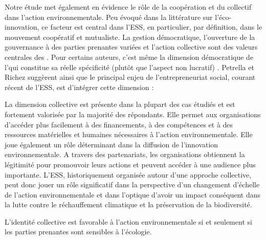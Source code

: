         Notre étude met également en évidence le rôle de la coopération et du collectif dans l'action environnementale. Peu évoqué dans la littérature sur l'éco-innovation, ce facteur est central dans l'ESS, en particulier, par définition, dans le mouvement coopératif et mutualiste. La gestion démocratique, l'ouverture de la gouvernance à des parties prenantes variées et l'action collective sont des valeurs centrales des \oess. Pour certains auteurs, c'est même la dimension démocratique de l'\ess qui constitue sa réelle spécificité (plutôt que l'aspect non lucratif) \parencite{mccambridge2004underestimating}. Petrella et Richez suggèrent ainsi que le principal enjeu de l'entrepreneuriat social, courant récent de l'ESS, est d'intégrer cette dimension :
        \begin{quotation}
             \parencite{petrella2014social}
        \end{quotation}

        La dimension collective est présente dans la plupart des cas étudiés et est fortement valorisée par la majorité des répondants. Elle permet aux organisations d'accéder plus facilement à des financements, à des compétences et à des ressources matérielles et humaines nécessaires à l'action environnementale. Elle joue également un rôle déterminant dans la diffusion de l'innovation environnementale. A travers des partenariats, les organisations obtiennent la légitimité pour promouvoir leurs actions et peuvent accéder à une audience plus importante. L'ESS, historiquement organisée autour d'une approche collective, peut donc jouer un rôle significatif dans la perspective d'un changement d'échelle de l'action environnementale et dans l'optique d'avoir un impact conséquent dans la lutte contre le réchauffement climatique et la préservation de la biodiversité.

         \begin{hyp}
        \label{prop:DET4a}
            L'identité collective est favorable à l'action environnementale si et seulement si les parties prenantes sont sensibles à l'écologie.
        \end{hyp}

